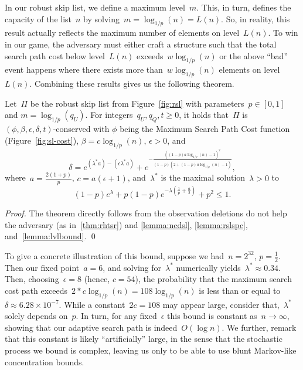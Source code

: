 In our robust skip list, we define a maximum level~$m$. This, in turn, defines the capacity of the list~$n$ by solving~$m = \log_{1/p}(n) = L(n)$. So, in reality, this result actually reflects the maximum number of elements on level~$L(n)$. To win in our game, the adversary must either craft a structure such that the total search path cost below level~$L(n)$ exceeds~$w \log_{1/p}(n)$ or the above ``bad'' event happens where there exists more than~$w \log_{1/p}(n)$ elements on level~$L(n)$. Combining these results gives us the following theorem.

\begin{theorem}\label{thm:rslsr}
    Let~$\Pi$ be the robust skip list from Figure~\ref{fig:rsl} with parameters~$p \in [0,1]$ and $m = \log_{1/p}(q_U)$. For integers~$q_U,q_Q,t \geq 0$, it holds that~$\Pi$ is~$(\phi,\beta,\epsilon,\delta,t)$-conserved with $\phi$ being the Maximum Search Path Cost function (Figure~\ref{fig:sl-cost}), $\beta = c \log_{1/p}(n)$, $\epsilon > 0 $, and 
    $$\delta = e^{(\lambda^{*}a) - (\epsilon\lambda^{*}a)} + e^{-\frac{((1-p)a\log_{1/p}(n)-1)^{2}}{(1-p)(2+(1-p)a\log_{1/p}(n)-1)}},$$
    where~$a=\frac{2(1+p)}{p}$, $c = a(\epsilon + 1)$, and~$\lambda^{*}$ is the maximal solution~$\lambda > 0$ to
 $$(1-p)e^{\lambda} + p(1-p)e^{-\lambda \left(\frac{1}{p} + \frac{a}{2} \right)} + p^2 \leq 1 .$$
\end{theorem}

\begin{proof}
    The theorem directly follows from the observation deletions do not help the adversary (as in~\cref{thm:rhtsr}) and \cref{lemma:ncdsl}, \cref{lemma:rslspc}, and~\cref{lemma:lvlbound}.
    \qed
\end{proof}

To give a concrete illustration of this bound, suppose we had~$n = 2^{32}$, $p=\frac{1}{2}$. Then our fixed point~$a = 6$, and solving for~$\lambda^{*}$ numerically yields~$\lambda^{*} \approx 0.34$. Then, choosing~$\epsilon = 8$ (hence, $c=54$), the probability that the maximum search cost path exceeds~$2*c \log_{1/p}(n) = 108 \log_{1/p}(n)$ is less than or equal to~$\delta \approx 6.28 \times 10^{-7}$. While a constant~$2c = 108$ may appear large, consider that,~$\lambda^{*}$ solely depends on~$p$. In turn, for any fixed~$\epsilon$ this bound is constant as~$n\to\infty$, showing that our adaptive search path is indeed~$O(\log n)$. We further, remark that this constant is likely ``artificially'' large, in the sense that the stochastic process we bound is complex, leaving us only to be able to use blunt Markov-like concentration bounds.

